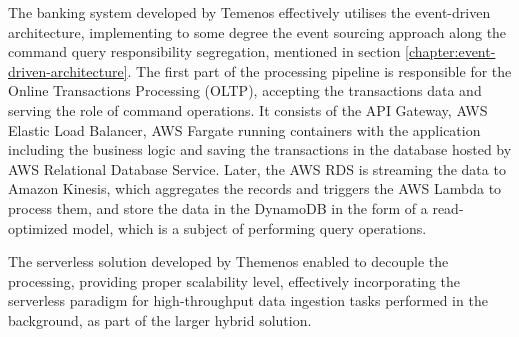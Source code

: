 The banking system developed by Temenos effectively utilises the event-driven architecture, implementing to some degree the event sourcing approach along the command query responsibility segregation, mentioned in section \ref{chapter:event-driven-architecture}.
The first part of the processing pipeline is responsible for the Online Transactions Processing (OLTP), accepting the transactions data and serving the role of command operations. It consists of the API Gateway, AWS Elastic Load Balancer, AWS Fargate running containers with the application including the business logic and saving the transactions in the database hosted by AWS Relational Database Service.
Later, the AWS RDS is streaming the data to Amazon Kinesis, which aggregates the records and triggers the AWS Lambda to process them, and store the data in the DynamoDB in the form of a read-optimized model, which is a subject of performing query operations.

The serverless solution developed by Themenos enabled to decouple the processing, providing proper scalability level, effectively incorporating the serverless paradigm for high-throughput data ingestion tasks performed in the background, as part of the larger hybrid solution.






